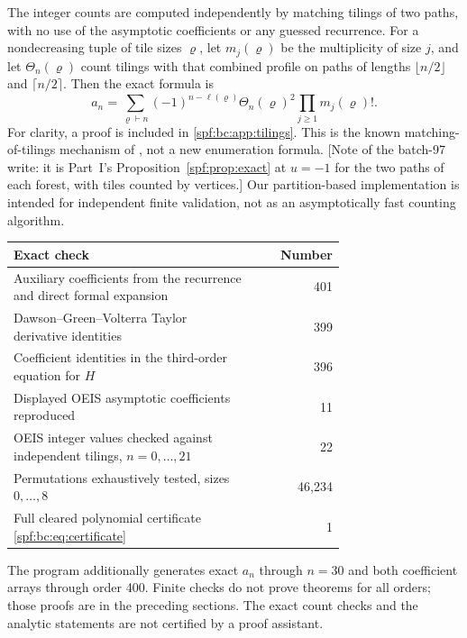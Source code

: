 \documentclass[11pt]{article}
\numberwithin{equation}{section}
\theoremstyle{definition}
\theoremstyle{remark}
\theoremstyle{definition}
\begin{document}
The integer counts are computed independently by matching tilings of two
paths, with no use of the asymptotic coefficients or any guessed recurrence.
For a nondecreasing tuple of tile sizes $\varrho$, let $m_j(\varrho)$ be the
multiplicity of size $j$, and let $\Theta_n(\varrho)$ count tilings with that combined
profile on paths of lengths $\lfloor n/2\rfloor$ and $\lceil n/2\rceil$.
Then the exact formula is
\begin{equation}
 a_n=\sum_{\varrho\vdash n}(-1)^{n-\ell(\varrho)}
             \Theta_n(\varrho)^2\prod_{j\ge1}m_j(\varrho)!.
 \label{spf:bc:eq:tilings}
\end{equation}
For clarity, a proof is included in \cref{spf:bc:app:tilings}. This is the known
matching-of-tilings mechanism of \cite{spahn,bcProveIt}, not a new enumeration
formula. [Note of the batch-97 write: it is Part~I's
Proposition~\ref{spf:prop:exact} at $u=-1$ for the two paths of each forest,
with tiles counted by vertices.] Our partition-based implementation is intended for independent
finite validation, not as an asymptotically fast counting algorithm.

\begin{center}
\small
\renewcommand{\arraystretch}{1.16}
\begin{tabular}{p{0.73\linewidth}r}
\toprule
Exact check & Number\\
\midrule
Auxiliary coefficients from the recurrence and direct formal expansion & 401\\
Dawson--Green--Volterra Taylor derivative identities & 399\\
Coefficient identities in the third-order equation for $H$ & 396\\
Displayed OEIS asymptotic coefficients reproduced & 11\\
OEIS integer values checked against independent tilings, $n=0,\ldots,21$ & 22\\
Permutations exhaustively tested, sizes $0,\ldots,8$ & 46,234\\
Full cleared polynomial certificate \eqref{spf:bc:eq:certificate} & 1\\
\bottomrule
\end{tabular}
\end{center}
The program additionally generates exact $a_n$ through $n=30$ and both
coefficient arrays through order 400. Finite checks do not prove theorems for
all orders; those proofs are in the preceding sections. The exact count
checks and the analytic statements are not certified by a proof assistant.
\end{document}
